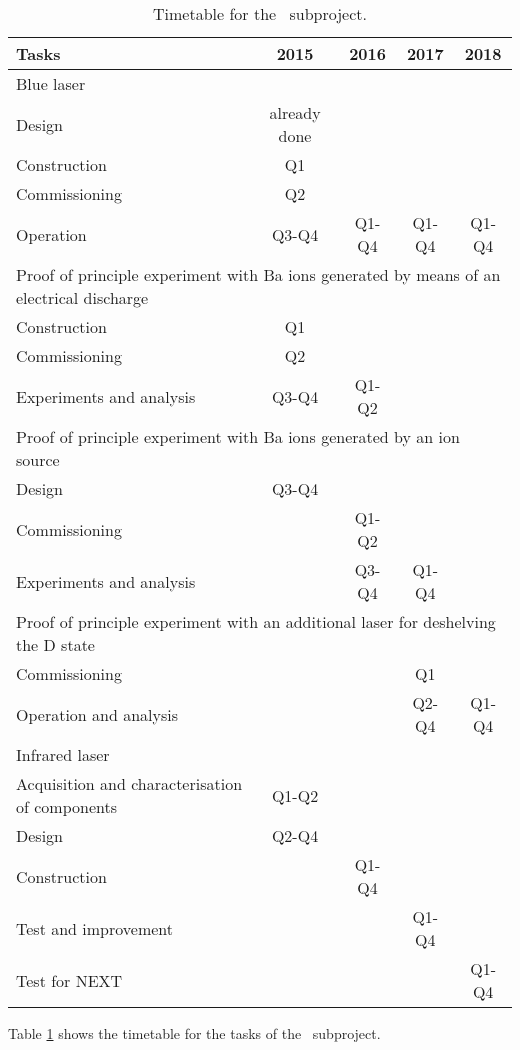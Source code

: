 \begin{table}
\begin{center}
\begin{tabular}{| l | c | c | c | c |}
\hline
Tasks & 2015 & 2016 & 2017 & 2018 \\
\hline
\multicolumn{5}{|l|}{Blue laser}  \\
\hline
Design & already done & & &  \\
Construction & Q1 & & & \\
Commissioning & Q2& & & \\
Operation &  Q3-Q4 & Q1-Q4 &  Q1-Q4&  Q1-Q4\\
\hline
\multicolumn{5}{|l|}{Proof of principle experiment with Ba ions generated by means of an electrical discharge}  \\
\hline
Construction  &  Q1 & & & \\
Commissioning &  Q2 & & & \\
Experiments and analysis &  Q3-Q4 & Q1-Q2& & \\
\hline
\multicolumn{5}{|l|}{Proof of principle experiment with Ba ions generated by an ion source}  \\
\hline
Design & Q3-Q4 & & &  \\
Commissioning  &  & Q1-Q2& & \\
Experiments and analysis &  & Q3-Q4 & Q1-Q4 & \\
\hline
\multicolumn{5}{|l|}{Proof of principle experiment with an additional laser for deshelving the D state}  \\
\hline
Commissioning  &  &  & Q1 & \\
Operation and analysis &  &  & Q2-Q4 & Q1-Q4 \\
\hline
\multicolumn{5}{|l|}{Infrared laser}  \\
\hline
Acquisition and characterisation of components  & Q1-Q2 & & &  \\
Design  & Q2-Q4  & & & \\
Construction &  & Q1-Q4 & & \\
Test and improvement &  & & Q1-Q4 & \\
Test for NEXT & & &  & Q1-Q4\\
\hline
\end{tabular}
\caption{Timetable for the \BATA\ subproject.}
\label{tab:schedule_bata}
\end{center}
\end{table}

Table \ref{tab:schedule_bata} shows the timetable for the tasks of the \BATA\ subproject. 
